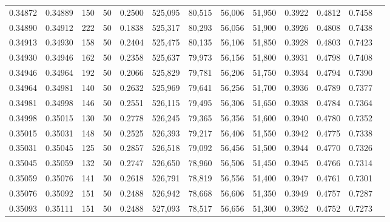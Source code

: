 \begin{tabular}{rrrrrrrrrrrrr}
0.34872 & 0.34889 &   150 &  50 &                                     0.2500 & 525,095 &  80,515 &  56,006 &  51,950 & 0.3922 & 0.4812 & 0.7458 \\
0.34890 & 0.34912 &   222 &  50 &                                     0.1838 & 525,317 &  80,293 &  56,056 &  51,900 & 0.3926 & 0.4808 & 0.7438 \\
0.34913 & 0.34930 &   158 &  50 &                                     0.2404 & 525,475 &  80,135 &  56,106 &  51,850 & 0.3928 & 0.4803 & 0.7423 \\
0.34930 & 0.34946 &   162 &  50 &                                     0.2358 & 525,637 &  79,973 &  56,156 &  51,800 & 0.3931 & 0.4798 & 0.7408 \\
0.34946 & 0.34964 &   192 &  50 &                                     0.2066 & 525,829 &  79,781 &  56,206 &  51,750 & 0.3934 & 0.4794 & 0.7390 \\
0.34964 & 0.34981 &   140 &  50 &                                     0.2632 & 525,969 &  79,641 &  56,256 &  51,700 & 0.3936 & 0.4789 & 0.7377 \\
0.34981 & 0.34998 &   146 &  50 &                                     0.2551 & 526,115 &  79,495 &  56,306 &  51,650 & 0.3938 & 0.4784 & 0.7364 \\
0.34998 & 0.35015 &   130 &  50 &                                     0.2778 & 526,245 &  79,365 &  56,356 &  51,600 & 0.3940 & 0.4780 & 0.7352 \\
0.35015 & 0.35031 &   148 &  50 &                                     0.2525 & 526,393 &  79,217 &  56,406 &  51,550 & 0.3942 & 0.4775 & 0.7338 \\
0.35031 & 0.35045 &   125 &  50 &                                     0.2857 & 526,518 &  79,092 &  56,456 &  51,500 & 0.3944 & 0.4770 & 0.7326 \\
0.35045 & 0.35059 &   132 &  50 &                                     0.2747 & 526,650 &  78,960 &  56,506 &  51,450 & 0.3945 & 0.4766 & 0.7314 \\
0.35059 & 0.35076 &   141 &  50 &                                     0.2618 & 526,791 &  78,819 &  56,556 &  51,400 & 0.3947 & 0.4761 & 0.7301 \\
0.35076 & 0.35092 &   151 &  50 &                                     0.2488 & 526,942 &  78,668 &  56,606 &  51,350 & 0.3949 & 0.4757 & 0.7287 \\
0.35093 & 0.35111 &   151 &  50 &                                     0.2488 & 527,093 &  78,517 &  56,656 &  51,300 & 0.3952 & 0.4752 & 0.7273 \\

\end{tabular}
